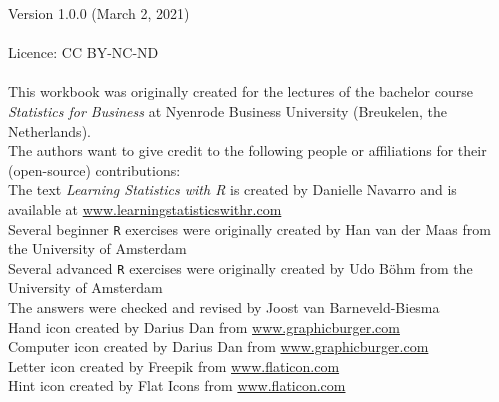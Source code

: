 \thispagestyle{emptyhead}

\vspace*{\fill} 

{\fontsize{8}{10}\selectfont

Version 1.0.0 (March 2, 2021) \\
\\
Licence: CC BY-NC-ND \\
\\
This workbook was originally created for the lectures of the bachelor course \textit{Statistics for Business} at Nyenrode Business University (Breukelen, the Netherlands). \\

The authors want to give credit to the following people or affiliations for their (open-source) contributions: \\

The text \textit{Learning Statistics with R} is created by Danielle Navarro and is available at \url{www.learningstatisticswithr.com} \\
Several beginner \texttt{R} exercises were originally created by Han van der Maas from the University of Amsterdam \\
Several advanced \texttt{R} exercises were originally created by Udo B{\"o}hm from the University of Amsterdam \\
The answers were checked and revised by Joost van Barneveld-Biesma \\
Hand icon created by Darius Dan from \url{www.graphicburger.com} \\
Computer icon created by Darius Dan from \url{www.graphicburger.com} \\
Letter icon created by Freepik from \url{www.flaticon.com} \\
Hint icon created by Flat Icons from \url{www.flaticon.com}

}

\clearpage %
